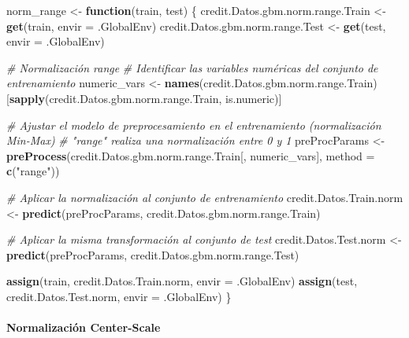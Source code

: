 \documentclass[
]{article}
\newenvironment{Shaded}{\begin{snugshade}}{\end{snugshade}}
\newcommand{\AttributeTok}[1]{\textcolor[rgb]{0.13,0.29,0.53}{#1}}
\newcommand{\CommentTok}[1]{\textcolor[rgb]{0.56,0.35,0.01}{\textit{#1}}}
\newcommand{\ControlFlowTok}[1]{\textcolor[rgb]{0.13,0.29,0.53}{\textbf{#1}}}
\newcommand{\FunctionTok}[1]{\textcolor[rgb]{0.13,0.29,0.53}{\textbf{#1}}}
\newcommand{\NormalTok}[1]{#1}
\newcommand{\OtherTok}[1]{\textcolor[rgb]{0.56,0.35,0.01}{#1}}
\newcommand{\StringTok}[1]{\textcolor[rgb]{0.31,0.60,0.02}{#1}}
\begin{document}
\begin{Shaded}
\begin{Highlighting}[]
\NormalTok{norm\_range }\OtherTok{\textless{}{-}} \ControlFlowTok{function}\NormalTok{(train, test) \{}
\NormalTok{  credit.Datos.gbm.norm.range.Train }\OtherTok{\textless{}{-}} \FunctionTok{get}\NormalTok{(train, }\AttributeTok{envir =}\NormalTok{ .GlobalEnv)}
\NormalTok{  credit.Datos.gbm.norm.range.Test }\OtherTok{\textless{}{-}} \FunctionTok{get}\NormalTok{(test, }\AttributeTok{envir =}\NormalTok{ .GlobalEnv)}
  
  \CommentTok{\# Normalización range}
  \CommentTok{\# Identificar las variables numéricas del conjunto de entrenamiento}
\NormalTok{  numeric\_vars }\OtherTok{\textless{}{-}} \FunctionTok{names}\NormalTok{(credit.Datos.gbm.norm.range.Train)[}\FunctionTok{sapply}\NormalTok{(credit.Datos.gbm.norm.range.Train, is.numeric)]}
  
  \CommentTok{\# Ajustar el modelo de preprocesamiento en el entrenamiento (normalización Min{-}Max)}
  \CommentTok{\# "range" realiza una normalización entre 0 y 1}
\NormalTok{  preProcParams }\OtherTok{\textless{}{-}} \FunctionTok{preProcess}\NormalTok{(credit.Datos.gbm.norm.range.Train[, numeric\_vars], }\AttributeTok{method =} \FunctionTok{c}\NormalTok{(}\StringTok{"range"}\NormalTok{))}
  
  \CommentTok{\# Aplicar la normalización al conjunto de entrenamiento}
\NormalTok{  credit.Datos.Train.norm }\OtherTok{\textless{}{-}} \FunctionTok{predict}\NormalTok{(preProcParams, credit.Datos.gbm.norm.range.Train)}
  
  \CommentTok{\# Aplicar la misma transformación al conjunto de test}
\NormalTok{  credit.Datos.Test.norm }\OtherTok{\textless{}{-}} \FunctionTok{predict}\NormalTok{(preProcParams, credit.Datos.gbm.norm.range.Test)}
  
  \FunctionTok{assign}\NormalTok{(train, credit.Datos.Train.norm, }\AttributeTok{envir =}\NormalTok{ .GlobalEnv)}
  \FunctionTok{assign}\NormalTok{(test, credit.Datos.Test.norm, }\AttributeTok{envir =}\NormalTok{ .GlobalEnv)}
\NormalTok{\}}
\end{Highlighting}
\end{Shaded}

\hypertarget{normalizaciuxf3n-center-scale}{%
\paragraph{Normalización
Center-Scale}\label{normalizaciuxf3n-center-scale}}
\end{document}
